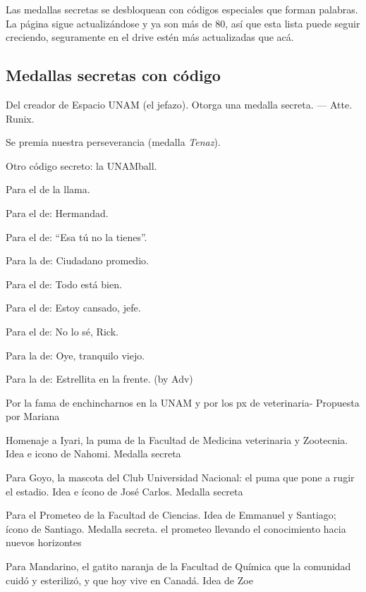 Las medallas secretas se desbloquean con códigos especiales que forman palabras. La página sigue actualizándose y ya son más de 80, así que esta lista puede seguir creciendo, seguramente en el drive estén más actualizadas que acá.

\subsection*{Medallas secretas con código}
\begin{description}[leftmargin=1.4cm, style=nextline]
  \item[3AKJEE] Del creador de Espacio UNAM (el jefazo). Otorga una medalla secreta. --- Atte. Runix.
  \item[T3NAZ7] Se premia nuestra perseverancia (medalla \emph{Tenaz}).
  \item[3Y3E34] Otro código secreto: la UNAMball.
  \item[OLAK4S3] Para el de la llama.
  \item[H3RM4N0] Para el de: Hermandad.
  \item[N0LAT3N] Para el de: ``Esa tú no la tienes''.
  \item[C1UDAD0] Para la de: Ciudadano promedio.
  \item[T0D0B1EN] Para el de: Todo está bien.
  \item[CANSAD0] Para el de: Estoy cansado, jefe.
  \item[N0SERICK] Para el de: No lo sé, Rick.
  \item[TR4NQU1] Para la de: Oye, tranquilo viejo.
  \item[ESTR3LL4] Para la de: Estrellita en la frente. (by Adv)
  \item[CH1NCH3] Por la fama de enchincharnos en la UNAM y por los px de veterinaria- Propuesta por Mariana
  \item[1YAR1] Homenaje a Iyari, la puma de la Facultad de Medicina veterinaria y Zootecnia. Idea e icono de Nahomi. Medalla secreta
  \item[G0Y0] Para Goyo, la mascota del Club Universidad Nacional: el puma que pone a rugir el estadio. Idea e ícono de José Carlos. Medalla secreta
  \item[PR0M3T30] Para el Prometeo de la Facultad de Ciencias. Idea de Emmanuel y Santiago; ícono de Santiago. Medalla secreta. el prometeo llevando el conocimiento hacia nuevos horizontes
  \item[M4ND4R1N] Para Mandarino, el gatito naranja de la Facultad de Química que la comunidad cuidó y esterilizó, y que hoy vive en Canadá. Idea de Zoe

\end{description}
